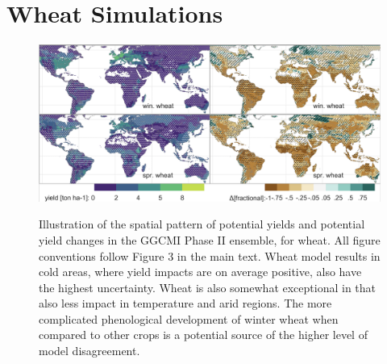 \documentclass[10pt]{article}
\begin{document}
\clearpage 
\section{Wheat Simulations}
\begin{figure}[h!]
\includegraphics[width=\textwidth]{s_wheat_baseline.png}\\
\caption{Illustration of the spatial pattern of potential yields and potential yield changes in the GGCMI Phase II ensemble, for wheat. All figure conventions follow Figure 3 in the main text. Wheat model results in cold areas, where yield impacts are on average positive, also have the highest uncertainty. Wheat is also somewhat exceptional in that  also less impact in temperature and arid regions. The more complicated phenological development of winter wheat when compared to other crops is a potential source of the higher level of model disagreement.}
\label{fig:wheatbaseline}
\end{figure}

\clearpage 
\end{document}
